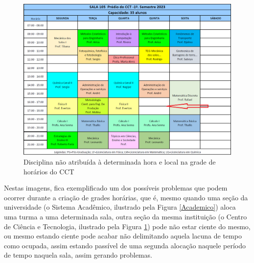 \begin{figure}[htbp]\centering
  \caption{\label{CCT}Disciplina não atribuída à determinada hora e local na grade de horários do CCT}
  \includegraphics[angle=0,scale=0.5]{files/img/FalhaDeAlocacao/Aulas-CCT-105-2023_1.png}
\end{figure}    %

Nestas imagens, fica exemplificado um dos possíveis problemas que podem ocorrer durante a criação de grades horárias, que é, mesmo quando uma seção da universidade (o Sistema Acadêmico, ilustrado pela Figura \ref{Academico}) aloca uma turma a uma determinada sala, outra seção da mesma instituição (o Centro de Ciência e Tecnologia, ilustrado pela Figura \ref{CCT}) pode não estar ciente do mesmo, ou mesmo estando ciente pode acabar não delimitando aquela lacuna de tempo como ocupada, assim estando passível de uma segunda alocação naquele período de tempo naquela sala, assim gerando problemas.

